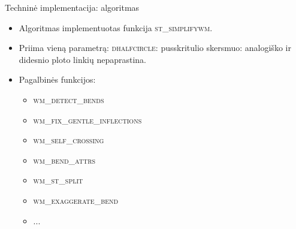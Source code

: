 \documentclass[14pt]{beamer}
\begin{document}
\begin{frame}{Techninė implementacija: algoritmas}
    \begin{itemize}[<+->]

        \item Algoritmas implementuotas funkcija \textsc{st\_simplifywm}.

        \item Priima vieną parametrą: \textsc{dhalfcircle}: pusskritulio
            skersmuo: analogiško ir didesnio ploto linkių nepaprastina.

        \item Pagalbinės funkcijos:
            \begin{itemize}
                \item<4> \textsc{wm\_detect\_bends}
                \item<4> \textsc{wm\_fix\_gentle\_inflections}
                \item<4> \textsc{wm\_self\_crossing}
                \item<4> \textsc{wm\_bend\_attrs}
                \item<4> \textsc{wm\_st\_split}
                \item<4> \textsc{wm\_exaggerate\_bend}
                \item<4> ...
            \end{itemize}

    \end{itemize}
\end{frame}
\end{document}
